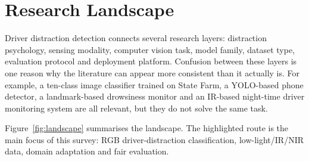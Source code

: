 \documentclass[11pt,a4paper]{article}
\let\oldsection\section
\renewcommand{\section}{\FloatBarrier\Needspace{9\baselineskip}\oldsection}
\begin{document}
\section{Research Landscape}

Driver distraction detection connects several research layers: distraction psychology, sensing modality, computer vision task, model family, dataset type, evaluation protocol and deployment platform. Confusion between these layers is one reason why the literature can appear more consistent than it actually is. For example, a ten-class image classifier trained on State Farm, a YOLO-based phone detector, a landmark-based drowsiness monitor and an IR-based night-time driver monitoring system are all relevant, but they do not solve the same task.

Figure~\ref{fig:landscape} summarises the landscape. The highlighted route is the main focus of this survey: RGB driver-distraction classification, low-light/IR/NIR data, domain adaptation and fair evaluation.
\end{document}

